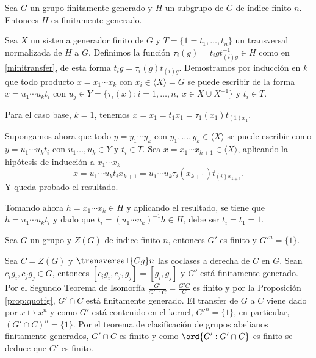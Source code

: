 \begin{proposicion}\label{prop:quotfg} %
	Sea $G$ un grupo finitamente generado y $H$ un subgrupo de $G$ de índice finito $n$. Entonces $H$ es finitamente generado.
	\begin{demostracion}
		Sea $X$ un sistema generador finito de $G$ y $T=\{1=t_1,\ldots,t_n\}$ un transversal normalizada de $H$ a $G$. Definimos la función $\tau_{i}(g) = t_igt_{(i)g}^{-1}\in H$ como en \eqref{minitransfer}, de esta forma $t_i g = \tau_{i}(g)t_{(i)g}$.
		Demostramos por inducción en $k$ que todo producto $x=x_1\cdots x_k$ con $x_i \in \langle X \rangle = G$ se puede escribir de la forma $x=u_1\cdots u_k t_i$ con $u_j\in Y=\{\tau_i(x) : i=1,\ldots,n,\ x\in X\cup X^{-1}\}$ y $t_i\in T$. 
		
		Para el caso base, $k=1$, tenemos $x=x_1=t_1x_1 = \tau_1(x_1)t_{(1)x_1}$.
		
		Supongamos ahora que todo $y=y_1\cdots y_k$ con $y_1,\ldots, y_k\in \langle X \rangle$ se puede escribir como $y=u_1\cdots u_k t_i$ con $u_1\ldots, u_k \in Y$ y $t_i\in T$.
		 Sea $x=x_1\cdots x_{k+1}\in \langle X \rangle$, aplicando la hipótesis de inducción a $x_1\cdots x_k$
		\begin{equation*}
			x=u_1\cdots u_k t_i x_{k+1} = u_1\cdots u_k \tau_i(x_{k+1}) t_{(i)x_{k+1}}.
		\end{equation*}
		Y queda probado el resultado.
		
		Tomando ahora $h=x_1\cdots x_k \in H$ y aplicando el resultado, se tiene que $h=u_1\cdots u_k t_i$ y dado que $t_i = (u_1\cdots u_k)^{-1} h\in H$, debe ser $t_i=t_1=1$.
		
		
		
	
	\end{demostracion}
\end{proposicion}

\begin{corolario}[Schur]
	Sea $G$ un grupo y $Z(G)$ de índice finito $n$, entonces $G'$ es finito y $G'^n = \{1\}$.
	\begin{demostracion}
		Sea $C=Z(G)$ y $\transversal {Cg} n$ las coclases a derecha de $C$ en $G$. Sean $c_ig_i,c_jg_j\in G$, entonces $[c_ig_i,c_j,g_j] = [g_i,g_j]$ y $G'$ está finitamente generado. Por el Segundo Teorema de Isomorfía $\frac{G'}{G'\cap C} = \frac{G'C}{C}$ es finito y por la Proposición \ref{prop:quotfg}, $G'\cap C$ está finitamente generado.
		El transfer de $G$ a $C$ viene dado por $x\mapsto x^n$ y como $G'$ está contenido en el kernel, $G'^n = \{1\}$, en particular, $(G'\cap C)^n = \{1\}$. Por el teorema de clasificación de grupos abelianos finitamente generados, $G'\cap C$ es finito y como $\ord{G':G'\cap C}$ es finito se deduce que $G'$ es finito.
	\end{demostracion}
\end{corolario}


